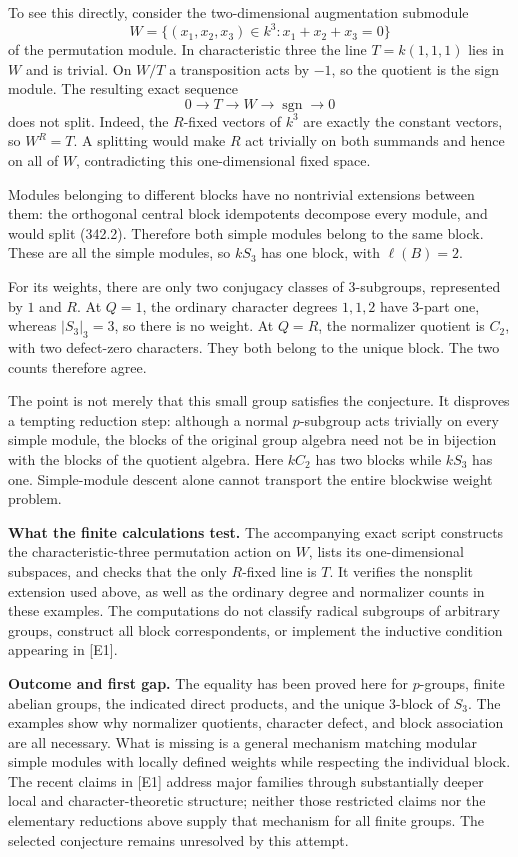 \documentclass[11pt]{article}
\begin{document}
To see this directly, consider the two-dimensional augmentation submodule
\[
 W=\{(x_1,x_2,x_3)\in k^3:x_1+x_2+x_3=0\}
\]
of the permutation module. In characteristic three the line $T=k(1,1,1)$ lies in $W$ and is trivial. On $W/T$ a transposition acts by $-1$, so the quotient is the sign module. The resulting exact sequence
\[
 0\longrightarrow T\longrightarrow W\longrightarrow\operatorname{sgn}
   \longrightarrow0
 \tag{342.2}
\]
does not split. Indeed, the $R$-fixed vectors of $k^3$ are exactly the constant vectors, so $W^R=T$. A splitting would make $R$ act trivially on both summands and hence on all of $W$, contradicting this one-dimensional fixed space.

Modules belonging to different blocks have no nontrivial extensions between them: the orthogonal central block idempotents decompose every module, and would split (342.2). Therefore both simple modules belong to the same block. These are all the simple modules, so $kS_3$ has one block, with $\ell(B)=2$.

For its weights, there are only two conjugacy classes of $3$-subgroups, represented by $1$ and $R$. At $Q=1$, the ordinary character degrees $1,1,2$ have $3$-part one, whereas $|S_3|_3=3$, so there is no weight. At $Q=R$, the normalizer quotient is $C_2$, with two defect-zero characters. They both belong to the unique block. The two counts therefore agree.

The point is not merely that this small group satisfies the conjecture. It disproves a tempting reduction step: although a normal $p$-subgroup acts trivially on every simple module, the blocks of the original group algebra need not be in bijection with the blocks of the quotient algebra. Here $kC_2$ has two blocks while $kS_3$ has one. Simple-module descent alone cannot transport the entire blockwise weight problem.

\textbf{What the finite calculations test.} The accompanying exact script constructs the characteristic-three permutation action on $W$, lists its one-dimensional subspaces, and checks that the only $R$-fixed line is $T$. It verifies the nonsplit extension used above, as well as the ordinary degree and normalizer counts in these examples. The computations do not classify radical subgroups of arbitrary groups, construct all block correspondents, or implement the inductive condition appearing in [E1].

\textbf{Outcome and first gap.} The equality has been proved here for $p$-groups, finite abelian groups, the indicated direct products, and the unique $3$-block of $S_3$. The examples show why normalizer quotients, character defect, and block association are all necessary. What is missing is a general mechanism matching modular simple modules with locally defined weights while respecting the individual block. The recent claims in [E1] address major families through substantially deeper local and character-theoretic structure; neither those restricted claims nor the elementary reductions above supply that mechanism for all finite groups. The selected conjecture remains unresolved by this attempt.
\end{document}
